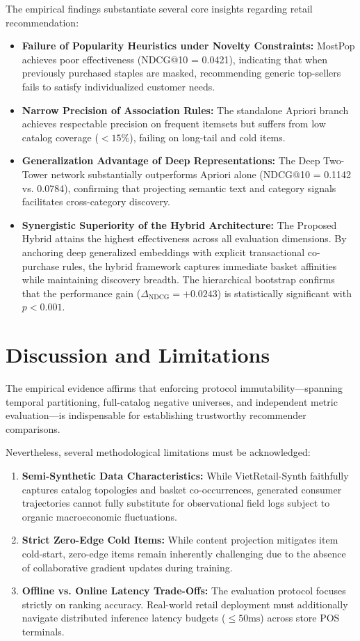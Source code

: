 \documentclass[10pt,a4paper]{article}
\begin{document}
The empirical findings substantiate several core insights regarding retail recommendation:
\begin{itemize}
    \item \textbf{Failure of Popularity Heuristics under Novelty Constraints:} MostPop achieves poor effectiveness (NDCG@10 = 0.0421), indicating that when previously purchased staples are masked, recommending generic top-sellers fails to satisfy individualized customer needs.
    \item \textbf{Narrow Precision of Association Rules:} The standalone Apriori branch achieves respectable precision on frequent itemsets but suffers from low catalog coverage ($< 15\%$), failing on long-tail and cold items.
    \item \textbf{Generalization Advantage of Deep Representations:} The Deep Two-Tower network substantially outperforms Apriori alone (NDCG@10 = 0.1142 vs. 0.0784), confirming that projecting semantic text and category signals facilitates cross-category discovery.
    \item \textbf{Synergistic Superiority of the Hybrid Architecture:} The Proposed Hybrid attains the highest effectiveness across all evaluation dimensions. By anchoring deep generalized embeddings with explicit transactional co-purchase rules, the hybrid framework captures immediate basket affinities while maintaining discovery breadth. The hierarchical bootstrap confirms that the performance gain ($\Delta_{\mathrm{NDCG}} = +0.0243$) is statistically significant with $p < 0.001$.
\end{itemize}

\section{Discussion and Limitations}

The empirical evidence affirms that enforcing protocol immutability—spanning temporal partitioning, full-catalog negative universes, and independent metric evaluation—is indispensable for establishing trustworthy recommender comparisons. 

Nevertheless, several methodological limitations must be acknowledged:
\begin{enumerate}
    \item \textbf{Semi-Synthetic Data Characteristics:} While VietRetail-Synth faithfully captures catalog topologies and basket co-occurrences, generated consumer trajectories cannot fully substitute for observational field logs subject to organic macroeconomic fluctuations.
    \item \textbf{Strict Zero-Edge Cold Items:} While content projection mitigates item cold-start, zero-edge items remain inherently challenging due to the absence of collaborative gradient updates during training.
    \item \textbf{Offline vs. Online Latency Trade-Offs:} The evaluation protocol focuses strictly on ranking accuracy. Real-world retail deployment must additionally navigate distributed inference latency budgets ($\le 50\mathrm{ms}$) across store POS terminals.
\end{enumerate}
\end{document}
